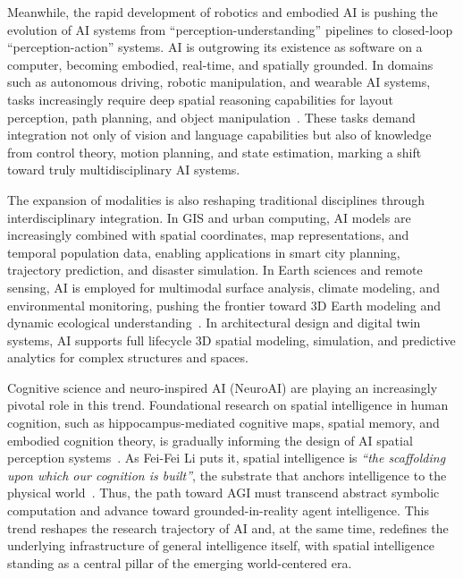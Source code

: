 Meanwhile, the rapid development of robotics and embodied AI is pushing the evolution of AI systems from ``perception-understanding'' pipelines to closed-loop ``perception-action'' systems.
AI is outgrowing its existence as software on a computer, becoming embodied, real-time, and spatially grounded.
In domains such as autonomous driving, robotic manipulation, and wearable AI systems, tasks increasingly require deep spatial reasoning capabilities for layout perception, path planning, and object manipulation~\cite{howard2019evolving,gupta2021embodied}. 
These tasks demand integration not only of vision and language capabilities but also of knowledge from control theory, motion planning, and state estimation, marking a shift toward truly multidisciplinary AI systems.



The expansion of modalities is also reshaping traditional disciplines through interdisciplinary integration. 
In GIS and urban computing, AI models are increasingly combined with spatial coordinates, map representations, and temporal population data, enabling applications in smart city planning, trajectory prediction, and disaster simulation. 
In Earth sciences and remote sensing, AI is employed for multimodal surface analysis, climate modeling, and environmental monitoring, pushing the frontier toward 3D Earth modeling and dynamic ecological understanding~\cite{janga2023review}. 
In architectural design and digital twin systems, AI supports full lifecycle 3D spatial modeling, simulation, and predictive analytics for complex structures and spaces.



Cognitive science and neuro-inspired AI (NeuroAI) are playing an increasingly pivotal role in this trend. 
Foundational research on spatial intelligence in human cognition, such as hippocampus-mediated cognitive maps, spatial memory, and embodied cognition theory, is gradually informing the design of AI spatial perception systems~\cite{o1978hippocampus,barsalou2008grounded}. 
As Fei-Fei Li puts it, spatial intelligence is \emph{``the scaffolding upon which our cognition is built''}, the substrate that anchors intelligence to the physical world~\cite{Feifei2025spatial}.
Thus, the path toward AGI must transcend abstract symbolic computation and advance toward grounded-in-reality agent intelligence.
This trend reshapes the research trajectory of AI and, at the same time, redefines the underlying infrastructure of general intelligence itself, with spatial intelligence standing as a central pillar of the emerging world-centered era.

























